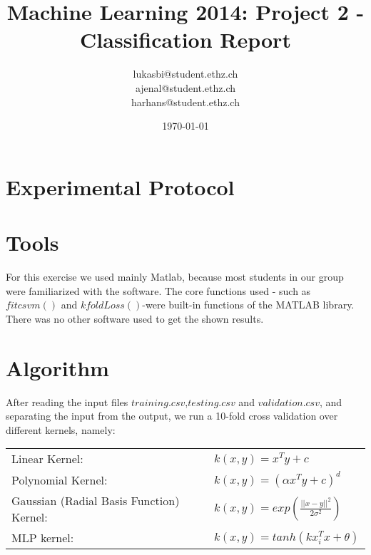 \documentclass[a4paper, 11pt]{article}
\title{Machine Learning 2014: Project 2 - Classification Report}
\author{lukasbi@student.ethz.ch\\ ajenal@student.ethz.ch\\ harhans@student.ethz.ch\\}
\date{\today}
\begin{document}
\lstset{language=Matlab} 
\maketitle

\section*{Experimental Protocol}

\section{Tools}

For this exercise we used mainly Matlab, because most students in our group were familiarized with the software. The core functions used - such as $fitcsvm()$ and $kfoldLoss()$-were built-in functions of the MATLAB library. 
There was no other software used to get the shown results.


\section{Algorithm}
After reading the input files $training.csv$,$testing.csv$ and $validation.csv$, and separating the input from the output, we run a 10-fold cross validation over different kernels, namely:

\begin{table}[h]

\centering

\begin{tabular}{l l}
 
Linear Kernel: & $k(x,y) = x^Ty + c$ \\

Polynomial Kernel: & $k(x,y) = (\alpha x^Ty + c)^d$ \\

Gaussian (Radial Basis Function) Kernel: & $k(x,y) = exp(\frac{ ||x-y||^2}{2 \sigma ^2} )$ \\

MLP kernel: & $k(x,y) = tanh( k x^T_ix+\theta)$

\end{tabular}

\end{table}
\end{document}
